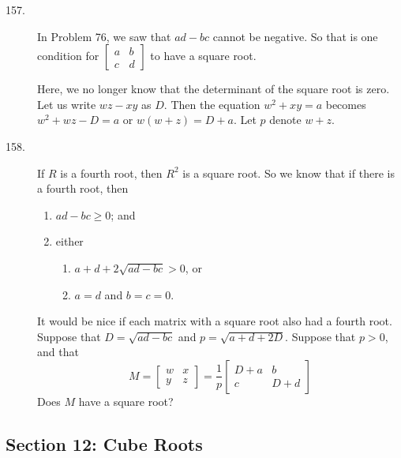 \documentclass{article}
\begin{document}
\begin{description}
  \item[157.] In Problem 76, we saw that $ad-bc$ cannot be negative. So that is one condition for $\begin{bmatrix} a & b \\ c & d \end{bmatrix}$ to have a square root.

    Here, we no longer know that the determinant of the square root is zero. Let us write $wz-xy$ as $D$. Then the equation $w^2 + xy = a$ becomes $w^2 + wz - D = a$ or $w(w + z) = D + a$. Let $p$ denote $w+z$.

  \item[158.] If $R$ is a fourth root, then $R^2$ is a square root. So we know that if there is a fourth root, then
    \begin{enumerate}[\hspace{1cm}(1)]
      \item $ad-bc \geq 0$; and
      \item either 
        \begin{enumerate}[\hspace{1cm}(a)]
          \item $a + d + 2\sqrt{ad-bc} > 0$, or 
          \item $a=d$ and $b=c=0$.
        \end{enumerate}
    \end{enumerate}
    It would be nice if each matrix with a square root also had a fourth root. Suppose that $D = \sqrt{ad-bc}$ and $p = \sqrt{a+d+2D}$. Suppose that $p > 0$, and that
    \begin{equation*}
      M = \begin{bmatrix} w & x \\ y & z \end{bmatrix}
      = \frac{1}{p} \begin{bmatrix} D+a & b \\ c & D+d \end{bmatrix}
    \end{equation*}
    Does $M$ have a square root?

\end{description}


\subsection*{Section 12: Cube Roots}
\end{document}
